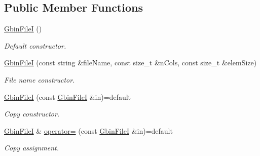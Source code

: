 \subsection*{Public Member Functions}
\begin{DoxyCompactItemize}
\item 
\mbox{\label{classsamp_files_1_1_gbin_file_i_a41599498567932edd1ed3961efbb4dd7}} 
\hyperlink{classsamp_files_1_1_gbin_file_i_a41599498567932edd1ed3961efbb4dd7}{Gbin\+FileI} ()
\begin{DoxyCompactList}\small\item\em Default constructor. \end{DoxyCompactList}\item 
\hyperlink{classsamp_files_1_1_gbin_file_i_ac77637d71f66c575de57443d9220984a}{Gbin\+FileI} (const string \&file\+Name, const size\+\_\+t \&n\+Cols, const size\+\_\+t \&elem\+Size)
\begin{DoxyCompactList}\small\item\em File name constructor. \end{DoxyCompactList}\item 
\mbox{\label{classsamp_files_1_1_gbin_file_i_aa72b1178ae2bf593812e9db019362388}} 
\hyperlink{classsamp_files_1_1_gbin_file_i_aa72b1178ae2bf593812e9db019362388}{Gbin\+FileI} (const \hyperlink{classsamp_files_1_1_gbin_file_i}{Gbin\+FileI} \&in)=default
\begin{DoxyCompactList}\small\item\em Copy constructor. \end{DoxyCompactList}\item 
\mbox{\label{classsamp_files_1_1_gbin_file_i_aeb231168e0b13ea71cb8382c2bfa2e5a}} 
\hyperlink{classsamp_files_1_1_gbin_file_i}{Gbin\+FileI} \& \hyperlink{classsamp_files_1_1_gbin_file_i_aeb231168e0b13ea71cb8382c2bfa2e5a}{operator=} (const \hyperlink{classsamp_files_1_1_gbin_file_i}{Gbin\+FileI} \&in)=default
\begin{DoxyCompactList}\small\item\em Copy assignment. \end{DoxyCompactList}\item 
\mbox{\label{classsamp_files_1_1_gbin_file_i_a62f43b4cacd682e70c3ad8ae5d674d08}} 

\end{DoxyCompactItemize}
